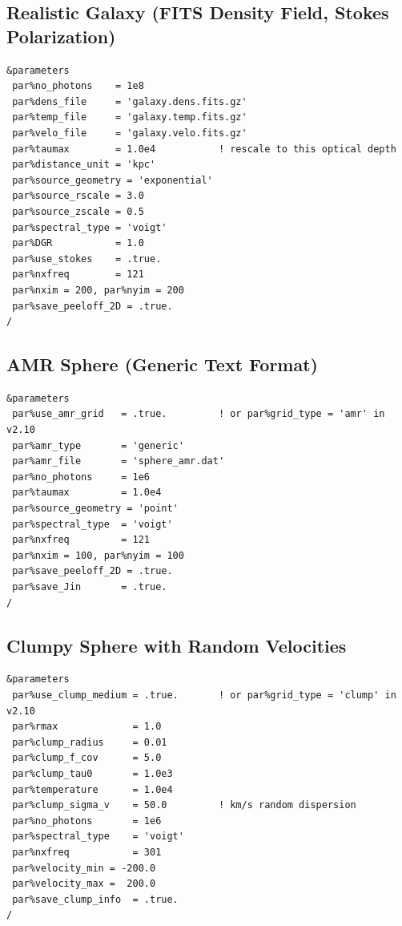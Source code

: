 \documentclass[english,a4paper]{my_memo}
\begin{document}
\subsection{Realistic Galaxy (FITS Density Field, Stokes Polarization)}

\begin{lstlisting}
&parameters
 par%no_photons    = 1e8
 par%dens_file     = 'galaxy.dens.fits.gz'
 par%temp_file     = 'galaxy.temp.fits.gz'
 par%velo_file     = 'galaxy.velo.fits.gz'
 par%taumax        = 1.0e4           ! rescale to this optical depth
 par%distance_unit = 'kpc'
 par%source_geometry = 'exponential'
 par%source_rscale = 3.0
 par%source_zscale = 0.5
 par%spectral_type = 'voigt'
 par%DGR           = 1.0
 par%use_stokes    = .true.
 par%nxfreq        = 121
 par%nxim = 200, par%nyim = 200
 par%save_peeloff_2D = .true.
/
\end{lstlisting}

\subsection{AMR Sphere (Generic Text Format)}

\begin{lstlisting}
&parameters
 par%use_amr_grid   = .true.         ! or par%grid_type = 'amr' in v2.10
 par%amr_type       = 'generic'
 par%amr_file       = 'sphere_amr.dat'
 par%no_photons     = 1e6
 par%taumax         = 1.0e4
 par%source_geometry = 'point'
 par%spectral_type  = 'voigt'
 par%nxfreq         = 121
 par%nxim = 100, par%nyim = 100
 par%save_peeloff_2D = .true.
 par%save_Jin       = .true.
/
\end{lstlisting}

\subsection{Clumpy Sphere with Random Velocities}

\begin{lstlisting}
&parameters
 par%use_clump_medium = .true.       ! or par%grid_type = 'clump' in v2.10
 par%rmax             = 1.0
 par%clump_radius     = 0.01
 par%clump_f_cov      = 5.0
 par%clump_tau0       = 1.0e3
 par%temperature      = 1.0e4
 par%clump_sigma_v    = 50.0         ! km/s random dispersion
 par%no_photons       = 1e6
 par%spectral_type    = 'voigt'
 par%nxfreq           = 301
 par%velocity_min = -200.0
 par%velocity_max =  200.0
 par%save_clump_info  = .true.
/
\end{lstlisting}
\end{document}
